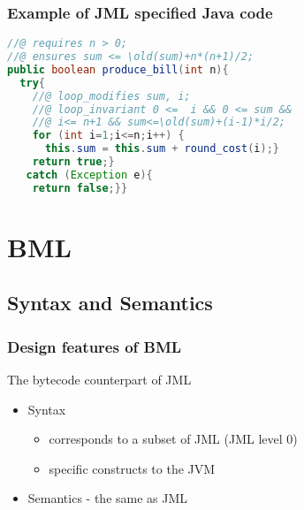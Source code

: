 \documentclass[c]{beamer}
\begin{document}
\begin{frame}\frametitle{Example of  JML specified Java code}

  
    
 \begin{lstlisting}[language=java]
//@ requires n > 0;
//@ ensures sum <= \old(sum)+n*(n+1)/2;
public boolean produce_bill(int n){
  try{
    //@ loop_modifies sum, i;
    //@ loop_invariant 0 <=  i && 0 <= sum &&
    //@ i<= n+1 && sum<=\old(sum)+(i-1)*i/2;
    for (int i=1;i<=n;i++) { 
      this.sum = this.sum + round_cost(i);}
    return true;} 
   catch (Exception e){ 
    return false;}} 
 \end{lstlisting}
\end{frame} 





\section{BML}


\subsection{Syntax and Semantics}

 \begin{frame}\frametitle{Design features of BML}
    The bytecode counterpart of JML
       \begin{itemize}
          \item Syntax  
	      \begin{itemize}
                \item  corresponds to a subset of JML (JML level 0)
                \item  specific constructs to the JVM %
              \end{itemize}
	  \item Semantics - the same  as JML
       \end{itemize}
 \end{frame}    
\end{document}

